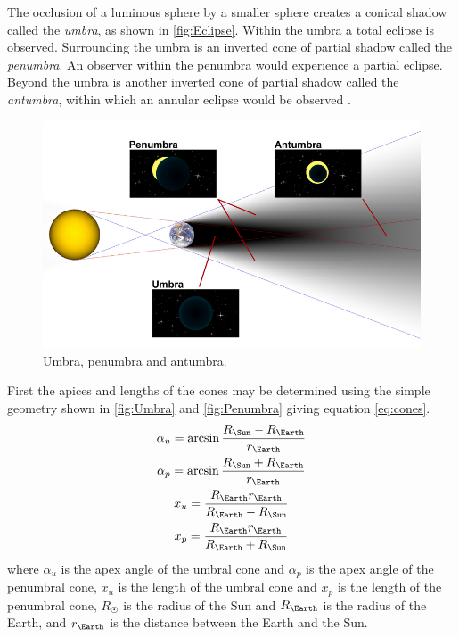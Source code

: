 The occlusion of a luminous sphere by a smaller sphere creates a conical shadow called the \emph{umbra}, as shown in \autoref{fig:Eclipse}. Within the umbra a total eclipse is observed. Surrounding the umbra is an inverted cone of partial shadow called the \emph{penumbra}. An observer within the penumbra would experience a partial eclipse. Beyond the umbra is another inverted cone of partial shadow called the \emph{antumbra}, within which an annular eclipse would be observed \parencite{Longo1995}.

\begin{figure}
\caption{Umbra, penumbra and antumbra.}
\label{fig:Eclipse}
\centering
\def\svgwidth{\figurewidth}
\includegraphics[width=\textwidth]{Images/eclipse.png}
\end{figure}

First the apices and lengths of the cones may be determined using the simple geometry shown in \autoref{fig:Umbra} and \autoref{fig:Penumbra} giving equation \eqref{eq:cones}.
\begin{subequations} \label{eq:cones}
\begin{gather}
\alpha_u = \arcsin\frac{R_\Sun-R_\Earth}{r_\Earth} \\
\alpha_p = \arcsin\frac{R_\Sun+R_\Earth}{r_\Earth} \\
x_u = \frac{R_\Earth r_\Earth}{R_\Earth-R_\Sun} \\
x_p = \frac{R_\Earth r_\Earth}{R_\Earth+R_\Sun}
\end{gather}
\end{subequations}
where $\alpha_u$ is the apex angle of the umbral cone and $\alpha_p$ is the apex angle of the penumbral cone, $x_u$ is the length of the umbral cone and $x_p$ is the length of the penumbral cone, $R_\Sun$ is the radius of the Sun and $R_\Earth$ is the radius of the Earth, and $r_\Earth$ is the distance between the Earth and the Sun.

